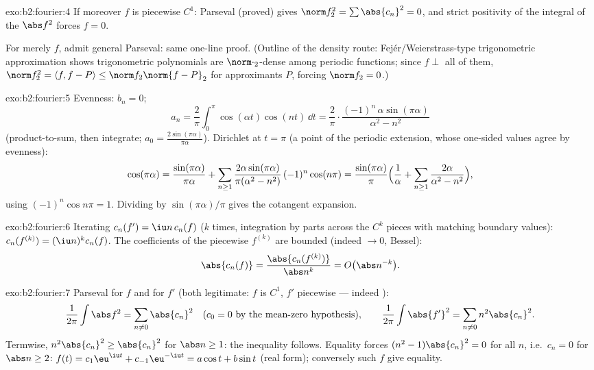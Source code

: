 \begin{solution}{exo:b2:fourier:4}
If moreover $f$ is piecewise $C^1$: Parseval (proved) gives
$\norm f_2^2 = \sum\abs{c_n}^2 = 0$, and strict positivity of the
integral of the  $\abs f^2$ forces $f = 0$.

For merely  $f$, admit general Parseval: same one-line
proof. (Outline of the density route: Fej\'er/Weierstrass-type
trigonometric approximation shows trigonometric polynomials are
$\norm\cdot_2$-dense among  periodic functions; since $f
\perp$ all of them, $\norm f_2^2 = \langle f, f - P\rangle \leq
\norm f_2\norm{f - P}_2$ for approximants $P$, forcing $\norm f_2 =
0$.)
\end{solution}

\begin{solution}{exo:b2:fourier:5}
Evenness: $b_n = 0$;
\[
a_n = \frac{2}{\pi}\int_0^\pi \cos(\alpha t)\cos(nt)\,\dd t
= \frac{2}{\pi}\cdot
\frac{(-1)^n\,\alpha\sin(\pi\alpha)}{\alpha^2 - n^2}
\]
(product-to-sum, then integrate; $a_0 =
\frac{2\sin(\pi\alpha)}{\pi\alpha}$). Dirichlet at $t = \pi$ (a
 point of the periodic extension, whose one-sided values
agree by evenness):
\[
\cos(\pi\alpha)
= \frac{\sin(\pi\alpha)}{\pi\alpha}
+ \sum_{n\geq1} \frac{2\alpha\sin(\pi\alpha)}{\pi(\alpha^2 -
n^2)}\,(-1)^n\cos(n\pi)
= \frac{\sin(\pi\alpha)}{\pi}\Bigl(\frac{1}{\alpha} +
\sum_{n\geq1}\frac{2\alpha}{\alpha^2 - n^2}\Bigr),
\]
using $(-1)^n\cos n\pi = 1$. Dividing by $\sin(\pi\alpha)/\pi$
gives the cotangent expansion.
\end{solution}

\begin{solution}{exo:b2:fourier:6}
Iterating $c_n(f') = \iu n\,c_n(f)$ ($k$ times, integration by
parts across the $C^{k}$ pieces with matching boundary values):
$c_n(f^{(k)}) = (\iu n)^k c_n(f)$. The coefficients of the
piecewise  $f^{(k)}$ are bounded (indeed $\to 0$, Bessel):
\[
\abs{c_n(f)} = \frac{\abs{c_n(f^{(k)})}}{\abs n^k}
= O\bigl(\abs n^{-k}\bigr) .
\]
\end{solution}

\begin{solution}{exo:b2:fourier:7}
Parseval for $f$ and for $f'$ (both legitimate: $f$ is $C^1$, $f'$
piecewise  --- indeed ):
\[
\frac{1}{2\pi}\int \abs f^2 = \sum_{n\neq0} \abs{c_n}^2
\quad (c_0 = 0 \text{ by the mean-zero hypothesis}),
\qquad
\frac{1}{2\pi}\int \abs{f'}^2 = \sum_{n\neq0} n^2\abs{c_n}^2 .
\]
Termwise, $n^2\abs{c_n}^2 \geq \abs{c_n}^2$ for $\abs n \geq 1$:
the inequality follows. Equality forces $(n^2 - 1)\abs{c_n}^2 = 0$
for all $n$, i.e.\ $c_n = 0$ for $\abs n \geq 2$: $f(t) =
c_1\eu^{\iu t} + c_{-1}\eu^{-\iu t} = a\cos t + b\sin t$ (real
form); conversely such $f$ give equality.
\end{solution}

